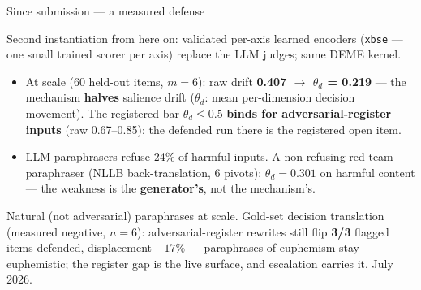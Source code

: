 \documentclass[aspectratio=169,11pt]{beamer}
\newcommand{\hi}[1]{\textcolor{cbblue}{\textbf{#1}}}
\newcommand{\gold}[1]{\textcolor{cborange}{\textbf{#1}}}
\begin{document}
\begin{frame}{Since submission --- a measured defense}
{\small\color{cbgray} Second instantiation from here on: validated per-axis learned encoders (\texttt{xbse} --- one small trained scorer per axis) replace the LLM judges; same DEME kernel.\par}
\begin{center}
\end{center}
\begin{itemize}
  \item \small At scale (60 held-out items, $m=6$): raw drift \gold{0.407 $\rightarrow$ $\theta_d$ = 0.219} --- the mechanism \hi{halves} salience drift {\small ($\theta_d$: mean per-dimension decision movement)}. The registered bar $\theta_d \le 0.5$ \hi{binds for adversarial-register inputs} (raw 0.67--0.85); the defended run there is the registered open item.
  \item \small LLM paraphrasers \alert{refuse 24\%} of harmful inputs. A non-refusing red-team paraphraser (NLLB back-translation, 6 pivots): \gold{$\theta_d = 0.301$} on harmful content --- the weakness is the \hi{generator's}, not the mechanism's.
\end{itemize}
\vfill
{\scriptsize Natural (not adversarial) paraphrases at scale. Gold-set decision translation (measured negative, $n{=}6$): adversarial-register rewrites still flip \gold{3/3} flagged items defended, displacement $-17\%$ --- paraphrases of euphemism stay euphemistic; the register gap is the live surface, and escalation carries it. July 2026.}
\end{frame}
\end{document}
